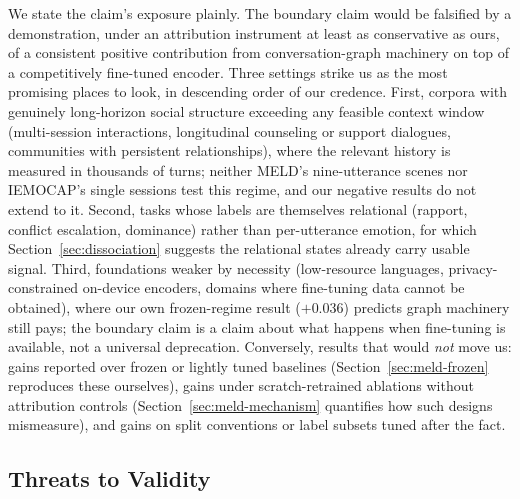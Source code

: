 We state the claim's exposure plainly. The boundary claim would be falsified by a demonstration, under an attribution instrument at least as conservative as ours, of a consistent positive contribution from conversation-graph machinery on top of a competitively fine-tuned encoder. Three settings strike us as the most promising places to look, in descending order of our credence. First, corpora with genuinely long-horizon social structure exceeding any feasible context window (multi-session interactions, longitudinal counseling or support dialogues, communities with persistent relationships), where the relevant history is measured in thousands of turns; neither MELD's nine-utterance scenes nor IEMOCAP's single sessions test this regime, and our negative results do not extend to it. Second, tasks whose labels are themselves relational (rapport, conflict escalation, dominance) rather than per-utterance emotion, for which Section~\ref{sec:dissociation} suggests the relational states already carry usable signal. Third, foundations weaker by necessity (low-resource languages, privacy-constrained on-device encoders, domains where fine-tuning data cannot be obtained), where our own frozen-regime result ($+0.036$) predicts graph machinery still pays; the boundary claim is a claim about what happens when fine-tuning is available, not a universal deprecation. Conversely, results that would \textit{not} move us: gains reported over frozen or lightly tuned baselines (Section~\ref{sec:meld-frozen} reproduces these ourselves), gains under scratch-retrained ablations without attribution controls (Section~\ref{sec:meld-mechanism} quantifies how such designs mismeasure), and gains on split conventions or label subsets tuned after the fact.

\subsection{Threats to Validity}

